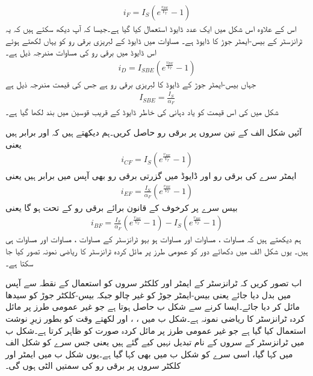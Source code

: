 \begin{align}
i_F = I_S \left (e^{\frac{v_{BE}}{V_T}}-1 \right )
\end{align}
اس کے علاوہ اس شکل میں ایک عدد ڈایوڈ استعمال کیا گیا ہے۔جیسا کہ آپ دیکھ سکتے ہیں کہ یہ ٹرانزسٹر کے بیس-ایمٹر  جوڑ کا ڈایوڈ   ہے۔ مساوات  میں ڈایوڈ کے لبریزی برقی رو کو یہاں لکھتے ہوئے اس ڈایوڈ میں برقی رو کی مساوات مندرجہ ذیل ہے۔
\begin{align}
i_D=I_{SBE} \left (e^{\frac{v_{BE}}{V_T}}-1 \right )
\end{align}
جہاں   بیس-ایمٹر  جوڑ کے ڈایوڈ کا لبریزی برقی رو ہے جس کی قیمت مندرجہ ذیل ہے
\begin{align}
I_{SBE}=\frac{I_S}{\alpha_F}
\end{align}
شکل میں  کی اس قیمت کو یاد دہانی کی خاطر ڈایوڈ کے قریب قوسین میں بند لکھا گیا ہے۔

آئیں شکل  الف کے تین سروں پر برقی رو حاصل کریں۔ہم دیکھتے ہیں کہ  اور  برابر ہیں یعنی
\begin{align} \label{مساوات_ٹرانزسٹر_ہوبہو_کلکٹر _سیدھی_رو}
i_{CF}=I_S \left (e^{\frac{v_{BE}}{V_T}}-1 \right )
\end{align}
ایمٹر سرے کی برقی رو  اور ڈایوڈ    میں گزرتی برقی رو   بھی آپس میں برابر ہیں یعنی
\begin{align} \label{مساوات_ٹرانزسٹر_ہوبہو_مخارج_سیدھی_رو}
i_{EF}=\frac{I_S}{\alpha_F} \left (e^{\frac{v_{BE}}{V_T}}-1 \right )
\end{align}
بیس سرے پر کرخوف کے قانون برائے برقی رو کے تحت   ہو گا یعنی
\begin{align} \label{مساوات_ٹرانزسٹر_ہوبہو_قابو_سیدھی_رو_الف}
i_{BF}=\frac{I_S}{\alpha_F} \left (e^{\frac{v_{BE}}{V_T}}-1 \right )-I_S \left (e^{\frac{v_{BE}}{V_T}}-1 \right )
\end{align}
ہم دیکھتے ہیں کہ مساوات  ، مساوات   اور مساوات   ہو بہو ٹرانزسٹر کے مساوات  ، مساوات   اور مساوات   ہی ہیں۔ یوں شکل  الف میں دکھائے دور کو عمومی طرز پر مائل کردہ ٹرانزسٹر کا ریاضی نمونہ  تصور کیا جا سکتا ہے۔

اب تصور کریں کہ ٹرانزسٹر کے ایمٹر اور کلکٹر  سروں کو استعمال کے نقطہ سے آپس میں بدل دیا جائے یعنی بیس-ایمٹر  جوڑ کو غیر چالو جبکہ بیس-کلکٹر جوڑ کو سیدھا مائل کر دیا جائے۔ایسا کرنے سے شکل  ب حاصل ہوتا ہے جو غیر عمومی طرز پر مائل کردہ ٹرانزسٹر کا ریاضی نمونہ  ہے۔شکل  ب میں   ، ، اور  لکھتے وقت   کو بطور  زیرِ نوشت استعمال کیا گیا ہے جو غیر عمومی طرز پر مائل کردہ صورت کو ظاہر کرتا ہے۔شکل  ب میں ٹرانزسٹر کے سروں کے نام تبدیل نہیں کیے گئے ہیں یعنی جس سرے کو شکل  الف   میں  کہا گیا، اسی سرے کو شکل  ب میں بھی  کہا گیا ہے۔یوں شکل  ب میں ایمٹر اور کلکٹر  سروں پر برقی رو کی سمتیں الٹی ہوں گی۔

